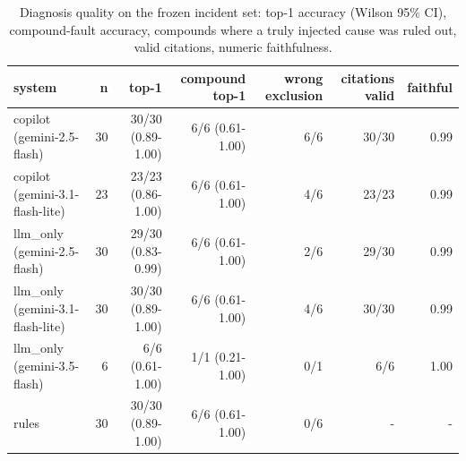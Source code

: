 \begin{table}[t]
\centering\small
\caption{Diagnosis quality on the frozen incident set: top-1 accuracy (Wilson 95\% CI), compound-fault accuracy, compounds where a truly injected cause was ruled out, valid citations, numeric faithfulness.}\label{tab:rq2_quality}
\begin{tabular}{lrrrrrr}
\toprule
system & n & top-1 & compound top-1 & wrong exclusion & citations valid & faithful \\
\midrule
copilot (gemini-2.5-flash) & 30 & 30/30 (0.89-1.00) & 6/6 (0.61-1.00) & 6/6 & 30/30 & 0.99 \\
copilot (gemini-3.1-flash-lite) & 23 & 23/23 (0.86-1.00) & 6/6 (0.61-1.00) & 4/6 & 23/23 & 0.99 \\
llm\_only (gemini-2.5-flash) & 30 & 29/30 (0.83-0.99) & 6/6 (0.61-1.00) & 2/6 & 29/30 & 0.99 \\
llm\_only (gemini-3.1-flash-lite) & 30 & 30/30 (0.89-1.00) & 6/6 (0.61-1.00) & 4/6 & 30/30 & 0.99 \\
llm\_only (gemini-3.5-flash) & 6 & 6/6 (0.61-1.00) & 1/1 (0.21-1.00) & 0/1 & 6/6 & 1.00 \\
rules & 30 & 30/30 (0.89-1.00) & 6/6 (0.61-1.00) & 0/6 & - & - \\
\bottomrule
\end{tabular}
\end{table}
